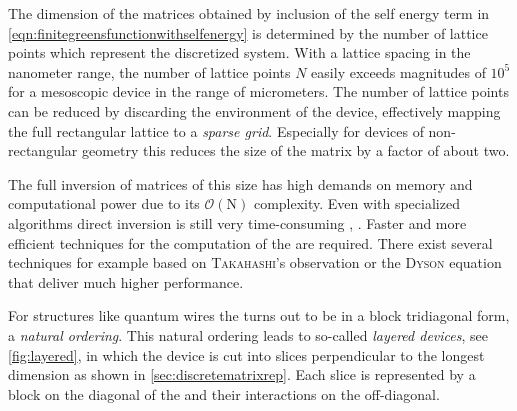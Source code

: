 The dimension of the matrices obtained by inclusion of the self energy term in \cref{eqn:finitegreensfunctionwithselfenergy} is determined by the number of lattice points which represent the discretized system.
With a lattice spacing in the nanometer range, the number of lattice points $N$ easily exceeds magnitudes of $10^5$ for a mesoscopic device in the range of micrometers. 
The number of lattice points can be reduced by discarding the environment of the device, effectively mapping the full rectangular lattice to a \emph{sparse grid}. Especially for devices of non-rectangular geometry this reduces the size of the matrix by a factor of about two.\par
The full inversion of matrices of this size has high demands on memory and computational power due to its $\mathcal{O}(\text{N})$ complexity. Even with specialized algorithms direct inversion is still very time-consuming \cite{Datta2000.2.53}, \cite{Li2009Thesis}. Faster and more efficient techniques for the computation of the \gfnc{} are required. There exist several techniques for example based on \textsc{Takahashi}'s observation \cite{Takahashi1973} or the \textsc{Dyson} equation that deliver much higher performance.\par
For structures like quantum wires the \hamil{} turns out to be in a block tridiagonal form, a \emph{natural ordering}. This natural ordering leads to so-called \emph{layered devices}, see \cref{fig:layered}, in which the device is cut into slices perpendicular to the longest dimension as shown in \cref{sec:discretematrixrep}. Each slice is represented by a block on the diagonal of the \hamil{} and their interactions on the off-diagonal.
